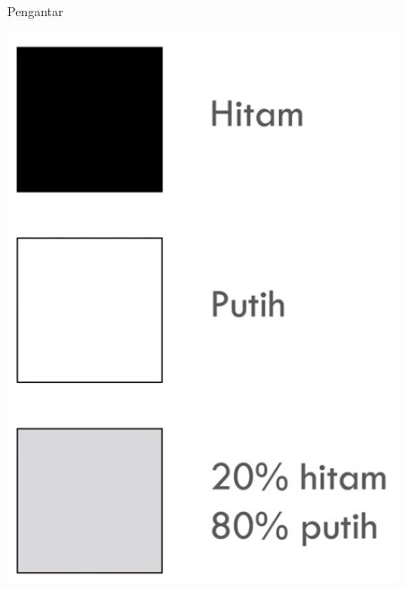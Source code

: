 \documentclass[pdflatex,compress,mathserif]{beamer}
\begin{document}
\begin{frame}{Pengantar}
	\begin{center}
		\includegraphics[height=0.7\textheight]{img/02}
	\end{center}
\end{frame}
\end{document}
